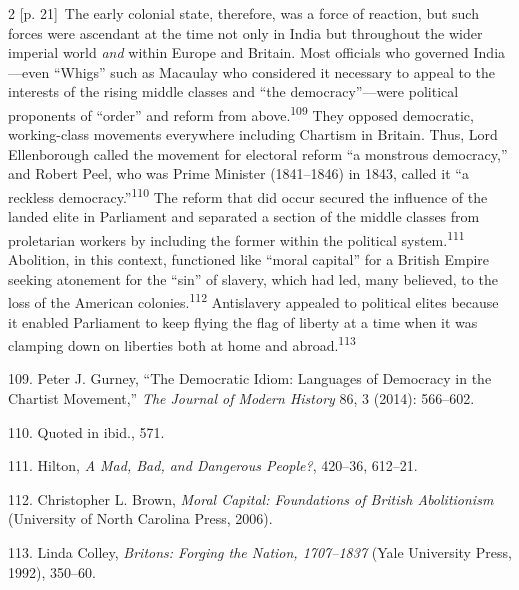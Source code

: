 \documentclass[10pt,a4paper]{article}
\begin{document}
\begin{paracol}{2}
{\scriptsize\color{gray} [p. 21]}\ The early colonial state, therefore, was a force of reaction, but such forces were ascendant at the time not only in India but throughout the wider imperial world \textit{and} within Europe and Britain. Most officials who governed India—even “Whigs” such as Macaulay who considered it necessary to appeal to the interests of the rising middle classes and “the democracy”—were political proponents of “order” and reform from above.\nobreak\textsuperscript{109} They opposed democratic, working-class movements everywhere including Chartism in Britain. Thus, Lord Ellenborough called the movement for electoral reform “a monstrous democracy,” and Robert Peel, who was Prime Minister (1841–1846) in 1843, called it “a reckless democracy.”\nobreak\textsuperscript{110} The reform that did occur secured the influence of the landed elite in Parliament and separated a section of the middle classes from proletarian workers by including the former within the political system.\nobreak\textsuperscript{111} Abolition, in this context, functioned like “moral capital” for a British Empire seeking atonement for the “sin” of slavery, which had led, many believed, to the loss of the American colonies.\nobreak\textsuperscript{112} Antislavery appealed to political elites because it enabled Parliament to keep flying the flag of liberty at a time when it was clamping down on liberties both at home and abroad.\nobreak\textsuperscript{113}\par{\small 109. Peter J. Gurney, “The Democratic Idiom: Languages of Democracy in the Chartist Movement,” \textit{The Journal of Modern History} 86, 3 (2014): 566–602.\par}{\small 110. Quoted in ibid., 571.\par}{\small 111. Hilton, \textit{A Mad, Bad, and Dangerous People?}, 420–36, 612–21.\par}{\small 112. Christopher L. Brown, \textit{Moral Capital: Foundations of British Abolitionism} (University of North Carolina Press, 2006).\par}{\small 113. Linda Colley, \textit{Britons: Forging the Nation, 1707–1837} (Yale University Press, 1992), 350–60.\par}
\switchcolumn*

\end{paracol}
\end{document}
